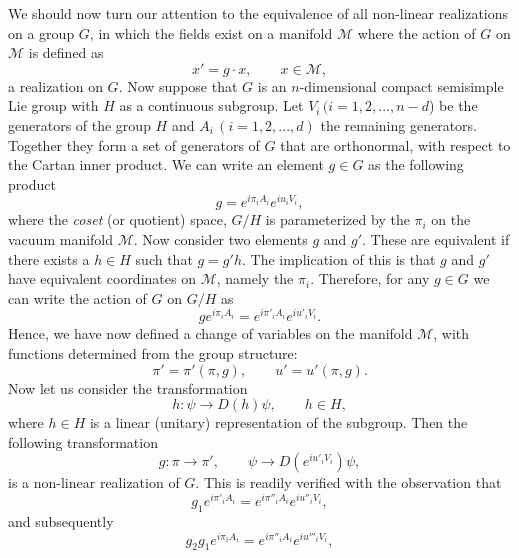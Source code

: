 We should now turn our attention to the equivalence of all non-linear realizations on a group $G$, in which the fields exist on a manifold $\mathcal{M}$ where the action of $G$ on $\mathcal{M}$ is defined as
\begin{equation}
x' = g \cdot x,\qquad x \in \mathcal{M},
\end{equation}
a realization on $G$. Now suppose that $G$ is an $n$-dimensional compact semisimple Lie group with $H$ as a continuous subgroup. Let $V_i\,(i=1,2,...,n-d$) be the generators of the group $H$ and $A_i\,(i=1,2,...,d)$ the remaining generators. Together they form a set of generators of $G$ that are orthonormal, with respect to the Cartan inner product. We can write an element $g \in G$ as the following product
\begin{equation}
g=e^{i \pi_i A_i}e^{i u_i V_i},
\end{equation}
where the \textit{coset} (or quotient) space, $G/H$ is parameterized by the $\pi_i$ on the vacuum manifold $\mathcal{M}$. Now consider two elements $g$ and $g'$. These are equivalent if there exists a $h \in H$ such that $g=g'h$. The implication of this is that $g$ and $g'$ have equivalent coordinates on $\mathcal{M}$, namely the $\pi_i$. Therefore, for any $g \in G$ we can write the action of $G$ on $G/H$ as
\begin{equation}
g e^{i \pi_i A_i}=e^{i \pi'_i A_i}e^{i u'_i V_i}.
\label{eqn:lcoset}
\end{equation}
Hence, we have now defined a change of variables on the manifold $\mathcal{M}$, with functions determined from the group structure:
\begin{equation}
\pi'=\pi'(\pi,g),\qquad u'=u'(\pi,g).
\end{equation}
Now let us consider the transformation
\begin{equation}
h:\psi \rightarrow D(h) \psi, \qquad h \in H,
\end{equation}
where $h \in H$ is a linear (unitary) representation of the subgroup. Then the following transformation
\begin{equation}
g:\pi \rightarrow \pi', \qquad \psi \rightarrow D \left( e^{iu'_i V_i} \right) \psi,
\label{eqn:standreal}
\end{equation}
is a non-linear realization of $G$. This is readily verified with the observation that
\begin{equation}
g_1 e^{i \pi'_i A_i} = e^{i \pi''_i A_i} e^{i u''_i V_i},
\end{equation}
and subsequently
\begin{equation}
g_2 g_1 e^{i \pi_i A_i} = e^{i \pi''_i A_i} e^{i u'''_i V_i},
\end{equation}
